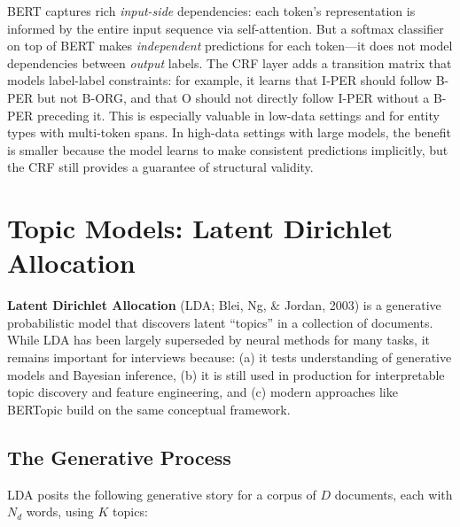 \begin{keyinsight}
BERT captures rich \emph{input-side} dependencies: each token's representation
is informed by the entire input sequence via self-attention.  But a softmax
classifier on top of BERT makes \emph{independent} predictions for each
token---it does not model dependencies between \emph{output} labels.  The CRF
layer adds a transition matrix that models label-label constraints: for
example, it learns that I-PER should follow B-PER but not B-ORG, and that
O should not directly follow I-PER without a B-PER preceding it.  This is
especially valuable in low-data settings and for entity types with multi-token
spans.  In high-data settings with large models, the benefit is smaller
because the model learns to make consistent predictions implicitly, but the
CRF still provides a guarantee of structural validity.
\end{keyinsight}


\section{Topic Models: Latent Dirichlet Allocation}
\label{sec:topic_models}

\textbf{Latent Dirichlet Allocation} (LDA; Blei, Ng, \& Jordan, 2003) is
a generative probabilistic model that discovers latent ``topics'' in a
collection of documents.  While LDA has been largely superseded by neural
methods for many tasks, it remains important for interviews because:
(a) it tests understanding of generative models and Bayesian inference,
(b) it is still used in production for interpretable topic discovery and
feature engineering, and (c) modern approaches like BERTopic build on the
same conceptual framework.

\subsection{The Generative Process}

LDA posits the following generative story for a corpus of $D$ documents,
each with $N_d$ words, using $K$ topics:

